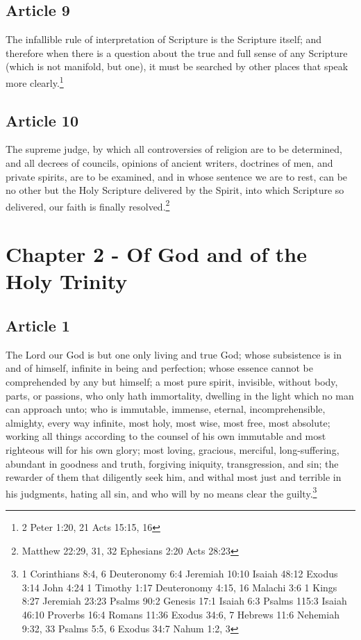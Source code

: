 \documentclass[12pt,letterpaper]{book}
\begin{document}
\section{Article 9}

The infallible rule of interpretation of Scripture is the Scripture itself; and therefore when there is a question about the true and full sense of any Scripture (which is not manifold, but one), it must be searched by other places that speak more clearly.\footnote{2 Peter 1:20, 21 Acts 15:15, 16}

\section{Article 10}

The supreme judge, by which all controversies of religion are to be determined, and all decrees of councils, opinions of ancient writers, doctrines of men, and private spirits, are to be examined, and in whose sentence we are to rest, can be no other but the Holy Scripture delivered by the Spirit, into which Scripture so delivered, our faith is finally resolved.\footnote{Matthew 22:29, 31, 32 Ephesians 2:20 Acts 28:23}

\chapter{Chapter 2 - Of God and of the Holy Trinity}
\section{Article 1}

The Lord our God is but one only living and true God; whose subsistence is in and of himself, infinite in being and perfection; whose essence cannot be comprehended by any but himself; a most pure spirit, invisible, without body, parts, or passions, who only hath immortality, dwelling in the light which no man can approach unto; who is immutable, immense, eternal, incomprehensible, almighty, every way infinite, most holy, most wise, most free, most absolute; working all things according to the counsel of his own immutable and most righteous will for his own glory; most loving, gracious, merciful, long-suffering, abundant in goodness and truth, forgiving iniquity, transgression, and sin; the rewarder of them that diligently seek him, and withal most just and terrible in his judgments, hating all sin, and who will by no means clear the guilty.\footnote{1 Corinthians 8:4, 6 Deuteronomy 6:4 Jeremiah 10:10 Isaiah 48:12 Exodus 3:14 John 4:24 1 Timothy 1:17 Deuteronomy 4:15, 16 Malachi 3:6 1 Kings 8:27 Jeremiah 23:23 Psalms 90:2 Genesis 17:1 Isaiah 6:3 Psalms 115:3 Isaiah 46:10 Proverbs 16:4 Romans 11:36 Exodus 34:6, 7 Hebrews 11:6 Nehemiah 9:32, 33 Psalms 5:5, 6 Exodus 34:7 Nahum 1:2, 3}
\end{document}
